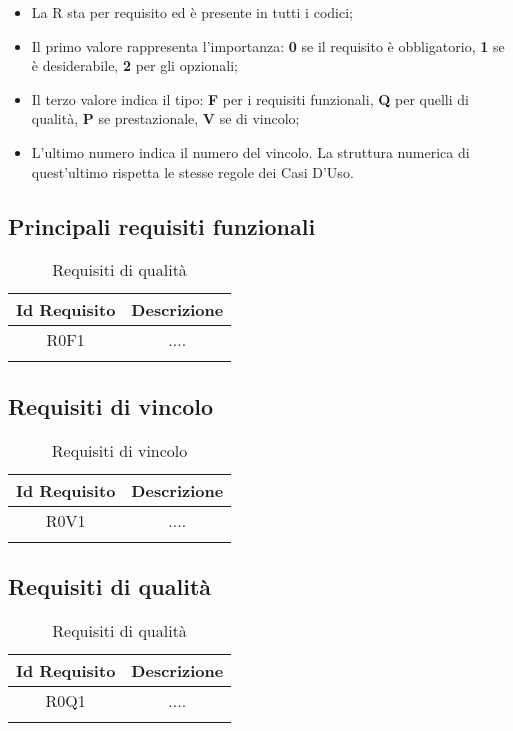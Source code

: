 \begin{itemize}
	\item La R sta per requisito ed è presente in tutti i codici;
	\item Il primo valore rappresenta l'importanza: \textbf{0} se il requisito è obbligatorio, \textbf{1} se è desiderabile, \textbf{2} per gli opzionali;
	\item Il terzo valore indica il tipo: \textbf{F} per i requisiti funzionali, \textbf{Q} per quelli di qualità, \textbf{P} se prestazionale, \textbf{V} se di vincolo;
	\item L'ultimo numero indica il numero del vincolo. La struttura numerica di quest'ultimo rispetta le stesse regole dei Casi D'Uso.
\end{itemize}

\subsection{Principali requisiti funzionali}
\begin{longtable}{|c|c|}
	\hline
	\textbf{Id Requisito} & \textbf{Descrizione}\\
	\hline
	\endhead
	R0F1 & ....  \\ \hline 
	\caption{Requisiti di qualità}
	\label{tabella:req}
\end{longtable}

\subsection{Requisiti di vincolo}
\begin{longtable}{|c|c|}
	\hline
	\textbf{Id Requisito} & \textbf{Descrizione}\\
	\hline
	\endhead
	R0V1 & ....  \\ \hline 
	\caption{Requisiti di vincolo}
	\label{tabella:reqV}
\end{longtable}

\subsection{Requisiti di qualità}
\begin{longtable}{|c|c|}
	\hline
	\textbf{Id Requisito} & \textbf{Descrizione}\\
	\hline
	\endhead
	R0Q1 & ....  \\ \hline 
	\caption{Requisiti di qualità}
	\label{tabella:reqQ}
\end{longtable}

